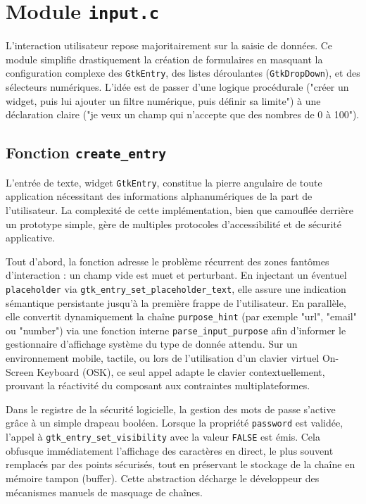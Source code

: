 \section{Module \texttt{input.c}}

L'interaction utilisateur repose majoritairement sur la saisie de données. Ce module simplifie drastiquement la création de formulaires en masquant la configuration complexe des \texttt{GtkEntry}, des listes déroulantes (\texttt{GtkDropDown}), et des sélecteurs numériques. L'idée est de passer d'une logique procédurale ("créer un widget, puis lui ajouter un filtre numérique, puis définir sa limite") à une déclaration claire ("je veux un champ qui n'accepte que des nombres de 0 à 100").

\subsection{Fonction \texttt{create\_entry}}

L'entrée de texte, widget \texttt{GtkEntry}, constitue la pierre angulaire de toute application nécessitant des informations alphanumériques de la part de l'utilisateur. La complexité de cette implémentation, bien que camouflée derrière un prototype simple, gère de multiples protocoles d'accessibilité et de sécurité applicative.

Tout d'abord, la fonction adresse le problème récurrent des zones fantômes d'interaction : un champ vide est muet et perturbant. En injectant un éventuel \texttt{placeholder} via \texttt{gtk\_entry\_set\_placeholder\_text}, elle assure une indication sémantique persistante jusqu'à la première frappe de l'utilisateur. En parallèle, elle convertit dynamiquement la chaîne \texttt{purpose\_hint} (par exemple "url", "email" ou "number") via une fonction interne \texttt{parse\_input\_purpose} afin d'informer le gestionnaire d'affichage système du type de donnée attendu. Sur un environnement mobile, tactile, ou lors de l'utilisation d'un clavier virtuel On-Screen Keyboard (OSK), ce seul appel adapte le clavier contextuellement, prouvant la réactivité du composant aux contraintes multiplateformes.

Dans le registre de la sécurité logicielle, la gestion des mots de passe s'active grâce à un simple drapeau booléen. Lorsque la propriété \texttt{password} est validée, l'appel à \texttt{gtk\_entry\_set\_visibility} avec la valeur \texttt{FALSE} est émis. Cela obfusque immédiatement l'affichage des caractères en direct, le plus souvent remplacés par des points sécurisés, tout en préservant le stockage de la chaîne en mémoire tampon (buffer). Cette abstraction décharge le développeur des mécanismes manuels de masquage de chaînes. 

